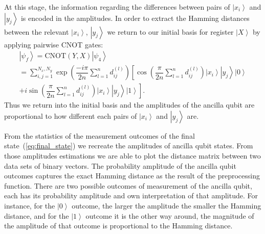 \documentclass[%
  pra, aps, physrev,
  showkeys,
  twocolumn,
  showpacs,
  superscriptaddress,
  amsmath,amssymb,
  10pt
]{revtex4-2}
\begin{document}
At this stage, the information regarding the differences between pairs of $\left| x_i \right\rangle$ and $\left| y_j \right\rangle$ is encoded in the amplitudes. In order to extract the Hamming distances between the relevant $\left| x_i \right\rangle$, $\left| y_j \right\rangle$ we return to our initial basis for register $\left| X \right\rangle$ by applying pairwise CNOT gates:
%
\begin{multline}
    \label{eq:final_state}
    \left| \psi_f \right\rangle =
    \mathrm{CNOT} (Y,X)\left| \psi_4 \right\rangle \\=
    \sum\limits_{i, j=1}^{N_x,N_y}
    \exp \left(\dfrac{-i \pi}{2n}\sum\limits_{l=1}^n d^{(l)}_{ij} \right)
        \left[ \cos\left(\dfrac{\pi}{2n}\sum\limits_{l=1}^n d^{(l)}_{ij} \right)
        \left| x_i \right\rangle
        \left| y_j \right\rangle
        \left| 0 \right\rangle\right.
        \\+
        \left. i \sin\left(\dfrac{\pi}{2n}\sum\limits_{l=1}^n d^{(l)}_{ij} \right)
        \left| x_i \right\rangle
        \left| y_j \right\rangle
        \left| 1 \right\rangle\right] .
\end{multline}
%
Thus we return into the initial basis and the amplitudes of the ancilla qubit are proportional to how different each pairs of $\left| x_i \right\rangle$ and $\left| y_j \right\rangle$ are.





From the statistics of the measurement outcomes of the final state~(\ref{eq:final_state}) we recreate the amplitudes of ancilla qubit states.
From those amplitudes estimations we are able to plot the distance matrix between two data sets of binary vectors.
The probability amplitude of the ancilla qubit outcomes captures the exact Hamming distance as the result of the preprocessing function.
There are two possible outcomes of measurement of the ancilla qubit, each has its probability amplitude and own interpretation of that amplitude.
For instance, for the $\left| 0 \right\rangle$ outcome, the larger the amplitude the smaller the Hamming distance,
and for the $\left| 1 \right\rangle$ outcome it is the other way around, the magnitude of the amplitude of that outcome is proportional to the Hamming distance.
\end{document}

